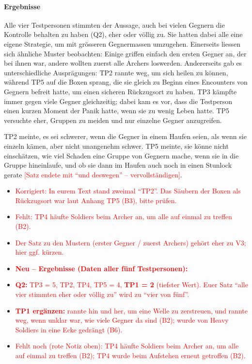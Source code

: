 \documentclass[../Main.tex]{subfiles}
\begin{document}
\paragraph{Ergebnisse}
Alle vier Testpersonen stimmten der Aussage, auch bei vielen Gegnern die Kontrolle behalten zu haben (Q2), eher oder völlig zu. Sie hatten dabei alle eine eigene Strategie, um mit grösseren Gegnermassen umzugehen. Einerseits liessen sich ähnliche Muster beobachten: Einige griffen einfach den ersten Gegner an, der bei ihnen war, andere wollten zuerst alle Archers loswerden. Andererseits gab es unterschiedliche Ausprägungen: TP2 rannte weg, um sich heilen zu können, während TP5 auf die Boxen sprang, die sie gleich zu Beginn eines Encounters von Gegnern befreit hatte, um einen sicheren Rückzugsort zu haben. TP3 kämpfte immer gegen viele Gegner gleichzeitig; dabei kam es vor, dass die Testperson einen kurzen Moment der Panik hatte, wenn sie zu wenig Leben hatte. TP5 versuchte eher, Gruppen zu meiden und nur einzelne Gegner anzugreifen.

TP2 meinte, es sei schwerer, wenn die Gegner in einem Haufen seien, als wenn sie einzeln kämen, aber nicht unangenehm schwer. TP5 meinte, sie könne nicht einschätzen, wie viel Schaden eine Gruppe von Gegnern mache, wenn sie in die Gruppe hineinlaufe, und ob sie dann im Haufen auch noch in einen Stunlock gerate \textcolor{red}{[Satz endete mit \enquote{und deswegen} -- vervollständigen]}.

\begin{itemize}[leftmargin=1.5cm]
    \item \textcolor{red}{Korrigiert: In eurem Text stand zweimal \enquote{TP2}. Das Säubern der Boxen als Rückzugsort war laut Anhang TP5 (B3), bitte prüfen.}
    \item \textcolor{red}{Fehlt: TP4 häufte Soldiers beim Archer an, um alle auf einmal zu treffen (B2).}
    \item \textcolor{red}{Der Satz zu den Mustern (erster Gegner / zuerst Archers) gehört eher zu V3; hier ggf. kürzen.}
\end{itemize}

\begin{itemize}[leftmargin=1.5cm]
    \item \textcolor{red}{\textbf{Neu -- Ergebnisse (Daten aller fünf Testpersonen):}}
    \item \textcolor{red}{\textbf{Q2:} TP3 = 5, TP2, TP4, TP5 = 4, \textbf{TP1 = 2} (tiefster Wert). Euer Satz \enquote{alle vier stimmten eher oder völlig zu} wird zu \enquote{vier von fünf}.}
    \item \textcolor{red}{\textbf{TP1 ergänzen:} rannte hin und her, um eine Welle zu zerstreuen, und rannte weg, wenn unklar war, wie viele Gegner da sind (B2); wurde von Heavy Soldiers in eine Ecke gedrängt (B6).}
    \item \textcolor{red}{Fehlt noch (rote Notiz oben): TP4 häufte Soldiers beim Archer an, um alle auf einmal zu treffen (B2); TP4 wurde beim Aufstehen erneut getroffen (B2).}
\end{itemize}
\end{document}
